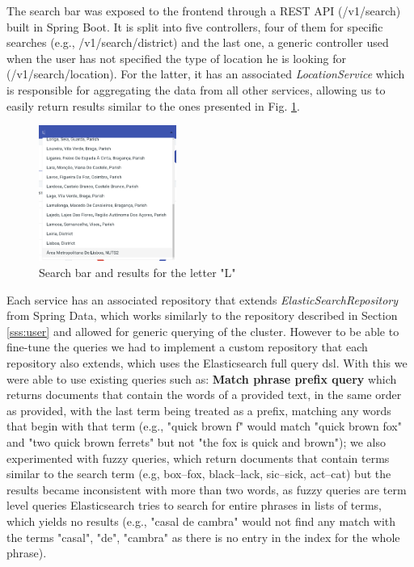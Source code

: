 

The search bar was exposed to the frontend through a REST API (/v1/search) built in Spring Boot. It is split into five controllers, four of them for specific searches (e.g., /v1/search/district) and the last one, a generic controller used when the user has not specified the type of location he is looking for (/v1/search/location). For the latter, it has an associated \textit{LocationService} which is responsible for aggregating the data from all other services, allowing us to easily return results similar to the ones presented in Fig. \ref{fig:search-bar}.

\begin{figure}[h]
    \centering 
    \includegraphics[width=0.4\textwidth]{Chapters/img/backend/search-bar.png}
    \caption{Search bar and results for the letter "L"} 
    \label{fig:search-bar}
\end{figure}

Each service has an associated repository that extends \textit{ElasticSearchRepository} from Spring Data, which works similarly to the repository described in Section \ref{sss:user} and allowed for generic querying of the cluster. However to be able to fine-tune the queries we had to implement a custom repository that each repository also extends, which uses the Elasticsearch full query \acrfull{dsl}. With this we were able to use existing queries such as: \textbf{Match phrase prefix query} which returns documents that contain the words of a provided text, in the same order as provided, with the last term being treated as a prefix, matching any words that begin with that term (e.g., "quick brown f" would match "quick brown fox" and "two quick brown ferrets" but not "the fox is quick and brown"); we also experimented with fuzzy queries, which return documents that contain terms similar to the search term (e.g, box--fox, black--lack, sic--sick, act--cat) but the results became inconsistent with more than two words, as fuzzy queries are term level queries Elasticsearch tries to search for entire phrases in lists of terms, which yields no results (e.g., "casal de cambra" would not find any match with the terms "casal", "de", "cambra" as there is no entry in the index for the whole phrase). 

